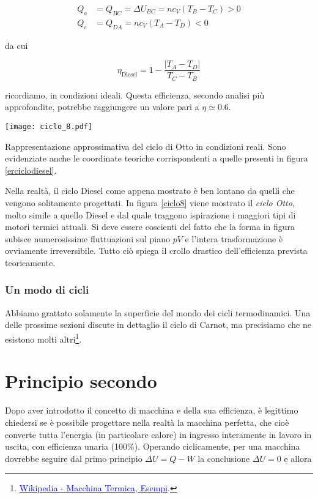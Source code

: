 \begin{align*}
    Q_a &= Q_{BC} = \Delta U_{BC} = nc_V(T_B - T_C) > 0\\
    Q_c &= Q_{DA} = nc_V(T_A - T_D) < 0
\end{align*}

\noindent da cui

\[ \eta_\text{Diesel} = 1 - \frac{|T_A - T_D|}{T_C - T_B} \]

\noindent ricordiamo, in condizioni ideali. Questa efficienza,
secondo analisi più approfondite, potrebbe raggiungere un
valore pari a $\eta \simeq 0.6$.

\begin{marginfigure}
    \centering
    \texttt{[image: ciclo\_8.pdf]}
    \caption{Rappresentazione approssimativa del ciclo di Otto in
    condizioni reali. Sono evidenziate anche le coordinate teoriche
    corrispondenti a quelle presenti in figura \ref{erciclodiesel}.}
    \label{ciclo8}
\end{marginfigure}

Nella realtà, il ciclo Diesel come appena mostrato è ben lontano
da quelli che vengono solitamente progettati. In figura \ref{ciclo8}
viene mostrato il \textit{ciclo Otto}, molto simile a quello Diesel
e dal quale traggono ispirazione i maggiori tipi di motori termici
attuali. Si deve essere coscienti del fatto che la forma in figura
subisce numerosissime fluttuazioni sul piano $pV$ e l'intera trasformazione
è ovviamente irreversibile. Tutto ciò spiega il crollo drastico
dell'efficienza prevista teoricamente.

\subsubsection*{Un modo di cicli}
Abbiamo grattato solamente la superficie del mondo dei cicli termodinamici.
Una delle prossime sezioni discute in dettaglio il ciclo di Carnot,
ma precisiamo che ne esistono molti altri\footnote{\href{https://it.wikipedia.org/wiki/Macchina_termica\#Esempi}{\textcolor{blue}{Wikipedia - Macchina Termica, Esempi}}.}. %





\section{Principio secondo}
Dopo aver introdotto il concetto di macchina e della sua efficienza,
è legittimo chiedersi se è possibile progettare nella realtà
la macchina perfetta, che cioè converte tutta l'energia
(in particolare calore) in ingresso interamente in lavoro in uscita,
con efficienza unaria (100\%).
Operando ciclicamente, per una macchina dovrebbe seguire dal primo
principio $\Delta U = Q - W$ la conclusione $\Delta U = 0$ e allora

